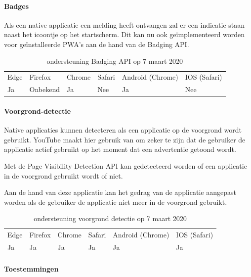 \paragraph{Badges}

Als een native applicatie een melding heeft ontvangen zal er een indicatie staan naast het icoontje op het startscherm. Dit kan nu ook geïmplementeerd worden voor geïnstalleerde PWA's aan de hand van de Badging API. \autocite{LePage2020a}

\begin{table}[H]
	\centering
	\begin{tabular}{llllll}
		Edge & Firefox & Chrome & Safari & Android (Chrome) & IOS (Safari) \\
		Ja   & Onbekend      &  Ja     & Nee     & Ja               & Nee          
	\end{tabular}	
	\caption{ondersteuning Badging API op 7 maart 2020}
\end{table}

\paragraph{Voorgrond-detectie }

Native applicaties kunnen detecteren als een applicatie op de voorgrond wordt gebruikt. YouTube maakt hier gebruik van om zeker te zijn dat de gebruiker de applicatie actief gebruikt op het moment dat een advertentie getoond wordt.

Met de Page Visibility Detection API \autocite{Grigorik2017} kan gedetecteerd worden of een applicatie in de voorgrond gebruikt wordt of niet. 

Aan de hand van deze applicatie kan het gedrag van de applicatie aangepast worden als de gebruiker de applicatie niet meer in de voorgrond gebruikt.

\begin{table}[H]
	\centering
	\begin{tabular}{llllll}
		Edge & Firefox & Chrome & Safari & Android (Chrome) & IOS (Safari) \\
		Ja   & Ja      &  Ja     & Ja     & Ja               & Ja          
	\end{tabular}	
	\caption{ondersteuning voorgrond detectie op 7 maart 2020}
\end{table}


\paragraph{Toestemmingen}

